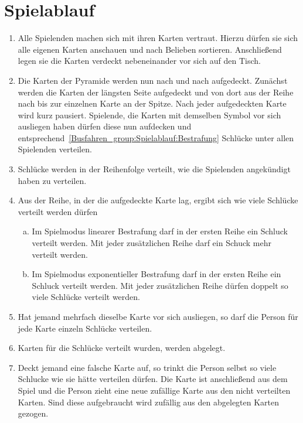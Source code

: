 \section{Spielablauf}\label{Busfahren_group:Spielablauf}
\begin{enumerate}[label={(\arabic*)}]
    \item
    Alle Spielenden machen sich mit ihren Karten vertraut.
    Hierzu dürfen sie sich alle eigenen Karten anschauen und nach Belieben sortieren.
    Anschließend legen sie die Karten verdeckt nebeneinander vor sich auf den Tisch.

    \item
    Die Karten der Pyramide werden nun nach und nach aufgedeckt.
    Zunächst werden die Karten der längsten Seite aufgedeckt und von dort aus der Reihe nach bis zur einzelnen Karte an der Spitze.
    Nach jeder aufgedeckten Karte wird kurz pausiert.
    Spielende, die Karten mit demselben Symbol vor sich ausliegen haben dürfen diese nun aufdecken und entsprechend~\ref{Busfahren_group:Spielablauf:Bestrafung} Schlücke unter allen Spielenden verteilen.

    \item Schlücke werden in der Reihenfolge verteilt, wie die Spielenden angekündigt haben zu verteilen.

    \item\label{Busfahren_group:Spielablauf:Bestrafung}
    Aus der Reihe, in der die aufgedeckte Karte lag, ergibt sich wie viele Schlücke verteilt werden dürfen
    \begin{enumerate}[a.]
        \item
        Im Spielmodus linearer Bestrafung darf in der ersten Reihe ein Schluck verteilt werden.
        Mit jeder zusätzlichen Reihe darf ein Schuck mehr verteilt werden.
        \item
        Im Spielmodus exponentieller Bestrafung darf in der ersten Reihe ein Schluck verteilt werden.
        Mit jeder zusätzlichen Reihe dürfen doppelt so viele Schlücke verteilt werden.
    \end{enumerate}

    \item 
    Hat jemand mehrfach dieselbe Karte vor sich ausliegen, so darf die Person für jede Karte einzeln Schlücke verteilen.

    \item
    Karten für die Schlücke verteilt wurden, werden abgelegt.

    \item\label{Busfahren_group:Spielablauf:Ziehen}
    Deckt jemand eine falsche Karte auf, so trinkt die Person selbst so viele Schlucke wie sie hätte verteilen dürfen.
    Die Karte ist anschließend aus dem Spiel und die Person zieht eine neue zufällige Karte aus den nicht verteilten Karten.
    Sind diese aufgebraucht wird zufällig aus den abgelegten Karten gezogen.


\end{enumerate}
